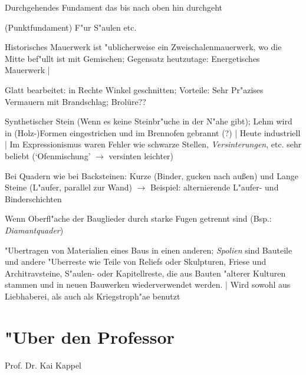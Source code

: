 \documentclass[]{scrartcl}
\begin{document}
\begin{description}[leftmargin=!,labelwidth=\widthof{\bfseries Halbs"aulenvorlage}]
  \item[Streifenfundament] Durchgehendes Fundament das bis nach oben hin durchgeht
  \item[Einzelfundament] (Punktfundament) F"ur S"aulen etc.
  \item[Mauerwerk] Historisches Mauerwerk ist "ublicherweise ein Zweischalenmauerwerk, wo die Mitte bef"ullt ist mit Gemischen; Gegensatz heutzutage: Energetisches Mauerwerk | 
  \item[Quader] Glatt bearbeitet: in Rechte Winkel geschnitten; Vorteile: Sehr Pr"azises Vermauern mit Brandschlag; Brolüre??
  \item[Backstein] Synthetischer Stein (Wenn es keine Steinbr"uche in der N"ahe gibt); Lehm wird in (Holz-)Formen eingestrichen und im Brennofen gebrannt (?) | Heute industriell | Im Expressionismus waren Fehler wie schwarze Stellen, \emph{Versinterungen}, etc. sehr beliebt (`Ofenmischung' $\rightarrow$ versinten leichter)
  \item[Binder \& L"aufer] Bei Quadern wie bei Backsteinen: Kurze (Binder, gucken nach au\ss en) und Lange Steine (L"aufer, parallel zur Wand) $\rightarrow$ Beispiel: alternierende L"aufer- und Binderschichten
  \item[Rustizierung] Wenn Oberfl"ache der Bauglieder durch starke Fugen getrennt sind (Bsp.: \emph{Diamantquader})
  \item[Spoliation] "Ubertragen von Materialien eines Baus in einen anderen; \emph{Spolien} sind Bauteile und andere "Uberreste wie Teile von Reliefs oder Skulpturen, Friese und Architravsteine, S"aulen- oder Kapitellreste, die aus Bauten "alterer Kulturen stammen und in neuen Bauwerken wiederverwendet werden. | Wird sowohl aus Liebhaberei, als auch als Kriegstroph"ae benutzt
\end{description}

\newpage
\section{"Uber den Professor}
Prof. Dr. Kai Kappel



\end{document}
